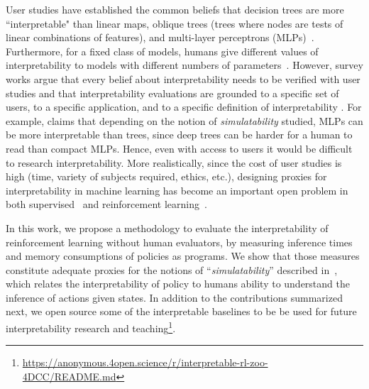 User studies have established the common beliefs that decision trees are more ``interpretable" than linear maps, oblique trees (trees where nodes are tests of linear combinations of features), and multi-layer perceptrons (MLPs)~\cite{study-0,study-1,study-2,study-3}. Furthermore, for a fixed class of models, humans give different values of interpretability to models with different numbers of parameters~\cite{study-4}. However, survey works argue that every belief about interpretability needs to be verified with user studies and that interpretability evaluations are grounded to a specific set of users, to a specific application, and to a specific definition of interpretability \cite{rigorous,mythos}. For example, \cite{mythos} claims that depending on the notion of \textit{simulatability} studied, MLPs can be more interpretable than trees, since deep trees can be harder for a human to read than compact MLPs. Hence, even with access to users it would be difficult to research interpretability. More realistically, since the cost of user studies is high (time, variety of subjects required, ethics, etc.), designing proxies for interpretability in machine learning has become an important open problem in both supervised~\cite{rigorous} and reinforcement learning~\cite{glanois-survey}.

In this work, we propose a methodology to evaluate the interpretability of reinforcement learning without human evaluators, by measuring inference times and memory consumptions of policies as programs. We show that those measures constitute adequate proxies for the notions of ``\textit{simulatability}'' described in~\cite{mythos}, which relates the interpretability of policy to humans ability to understand the inference of actions given states. In addition to the contributions summarized next, we open source some of the interpretable baselines to be be used for future interpretability research and teaching\footnote{\url{https://anonymous.4open.science/r/interpretable-rl-zoo-4DCC/README.md}}.
